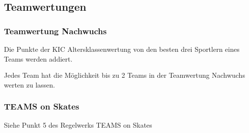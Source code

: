\subsection{Teamwertungen}

\subsubsection{Teamwertung Nachwuchs}
\label{subsec:teamwertung-nachwuchs}
Die Punkte der KIC Altersklassenwertung von den besten drei Sportlern eines Teams werden addiert. 

Jedes Team hat die Möglichkeit bis zu 2 Teams in der Teamwertung Nachwuchs werten zu lassen.

\subsubsection{TEAMS on Skates}
\label{subsec:teams-on-skates}
Siehe Punkt 5 des Regelwerks TEAMS on Skates
